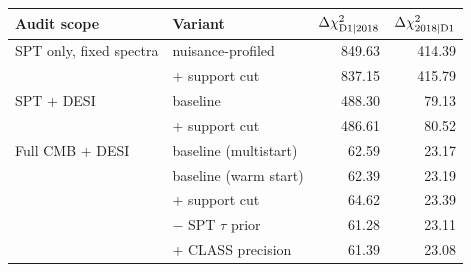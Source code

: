 \begin{tabular}{@{}l l r r@{}}
\toprule
Audit scope & Variant & $\Delta \chi^2_{\mathrm{D1}|2018}$ & $\Delta \chi^2_{2018|\mathrm{D1}}$ \\
\midrule
SPT only, fixed spectra & nuisance-profiled & 849.63 & 414.39 \\
 & + support cut & 837.15 & 415.79 \\
\addlinespace
SPT + DESI & baseline & 488.30 & 79.13 \\
 & + support cut & 486.61 & 80.52 \\
\addlinespace
Full CMB + DESI & baseline (multistart) & 62.59 & 23.17 \\
 & baseline (warm start) & 62.39 & 23.19 \\
 & + support cut & 64.62 & 23.39 \\
 & $-$ SPT $\tau$ prior & 61.28 & 23.11 \\
 & + CLASS precision & 61.39 & 23.08 \\
\bottomrule
\end{tabular}
